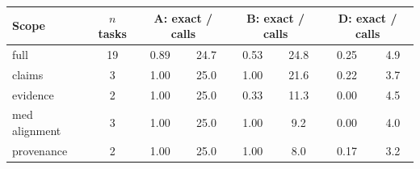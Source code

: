 \begin{tabular}{@{}lccccccc@{}}
\toprule
Scope & $n$ tasks & \multicolumn{2}{c}{A: exact / calls} & \multicolumn{2}{c}{B: exact / calls} & \multicolumn{2}{c}{D: exact / calls} \\
\midrule
full & 19 & 0.89 & 24.7 & 0.53 & 24.8 & 0.25 & 4.9 \\
claims & 3 & 1.00 & 25.0 & 1.00 & 21.6 & 0.22 & 3.7 \\
evidence & 2 & 1.00 & 25.0 & 0.33 & 11.3 & 0.00 & 4.5 \\
med alignment & 3 & 1.00 & 25.0 & 1.00 & 9.2 & 0.00 & 4.0 \\
provenance & 2 & 1.00 & 25.0 & 1.00 & 8.0 & 0.17 & 3.2 \\
\bottomrule
\end{tabular}
